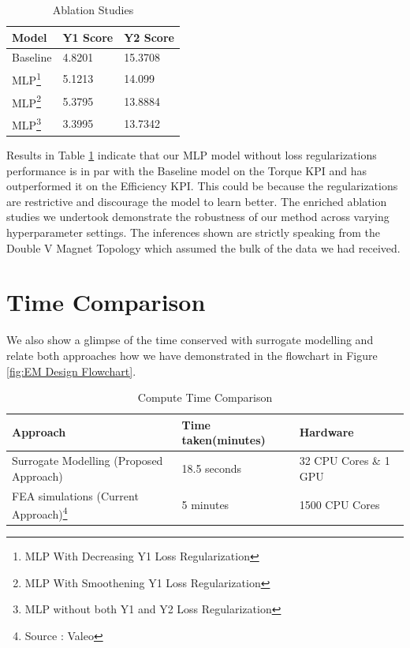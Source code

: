 \documentclass{report} %
\begin{document}
\begin{minipage}[t]{\textwidth}
    \begin{table}[H]
        \centering
        \begin{tabular}{|p{}|p{}|p{}|}
        \hline {\bf Model} & {\bf Y1 Score} & {\bf Y2 Score}\\
        \hline 
        Baseline & 4.8201 & 15.3708 \\
        MLP\footnote{MLP With Decreasing Y1 Loss Regularization} & 5.1213 & 14.099 \\
        MLP\footnote{MLP With Smoothening Y1 Loss Regularization} & 5.3795 & 13.8884 \\
        MLP\footnote{MLP without both Y1 and Y2 Loss Regularization} & 3.3995 & 13.7342  \\
        \hline
        \end{tabular}
        \caption{Ablation Studies}
        \label{tab:Ablation Studies}
    \end{table}
\end{minipage}

\vspace{1em} %

Results in Table \ref{tab:Ablation Studies} indicate that our \ac{MLP} model without loss regularizations performance is in par with the Baseline model on the Torque 
\ac{KPI} and has outperformed it on the Efficiency \ac{KPI}. This could be because the regularizations are restrictive and discourage the model to learn better.
The enriched ablation studies we undertook demonstrate the robustness of our method across varying hyperparameter settings.
The inferences shown are strictly speaking from the Double V Magnet Topology which assumed the bulk of the data we had received.

\section{Time Comparison}\label{sec:Time Comparison}

We also show a glimpse of the time conserved with surrogate modelling and relate both approaches how we have demonstrated in the flowchart in Figure 
\ref{fig:EM Design Flowchart}.

\begin{minipage}[t]{\textwidth}
    \begin{table}[H]
        \centering
        \begin{tabular}{|p{}|p{}|p{}|}
        \hline {\bf Approach} & {\bf Time taken(minutes)} & {\bf Hardware}\\
        \hline 
        Surrogate Modelling (Proposed Approach) & 18.5 seconds & 32 CPU Cores \& 1 GPU\\
        \ac{FEA} simulations (Current Approach)\footnote{Source : Valeo} & 5 minutes & 1500 CPU Cores\\
        \hline
        \end{tabular}
        \caption{Compute Time Comparison}
        \label{tab:Compute Time Comparisions}
    \end{table}
\end{minipage}
\end{document}
